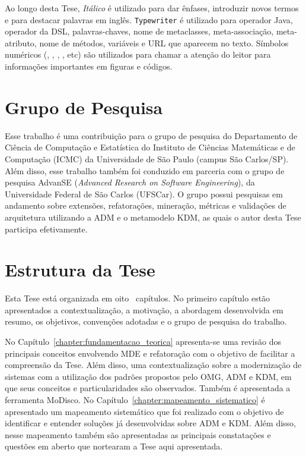 Ao longo desta Tese, \textit{Itálico} é utilizado para dar ênfases, introduzir novos termos e para destacar palavras em inglês. \texttt{Typewriter} é utilizado para operador Java, operador da DSL, palavras-chaves, nome de metaclasses, meta-associação, meta-atributo, nome de métodos, variáveis e URL que aparecem no texto. Símbolos numéricos (, , , , etc) são utilizados para chamar a atenção do leitor para informações importantes em figuras e códigos.

\section{Grupo de Pesquisa}

Esse trabalho é uma contribuição para o grupo de pesquisa do Departamento de Ciência de Computação e Estatística do Instituto de Ciências Matemáticas e de Computação (ICMC) da Universidade de São Paulo (campus São Carlos/SP). Além disso, esse trabalho também foi conduzido em parceria com o grupo de pesquisa AdvanSE (\textit{Advanced Research on Software Engineering}), da Universidade Federal de São Carlos (UFSCar). O grupo possui pesquisas em andamento sobre extensões, refatorações, mineração, métricas e validações de arquitetura utilizando a ADM e o metamodelo KDM, as quais o autor desta Tese participa efetivamente.

\section{Estrutura da Tese}

Esta Tese está organizada em oito~ capítulos. No primeiro capítulo estão apresentados a contextualização, a motivação, a abordagem desenvolvida em resumo, os objetivos, convenções adotadas e o grupo de pesquisa do trabalho. 

No Capítulo~\ref{chapter:fundamentacao_teorica} apresenta-se uma revisão dos principais conceitos envolvendo MDE e refatoração com o objetivo de facilitar a compreensão da Tese. Além disso, uma contextualização sobre a modernização de sistemas com a utilização dos padrões propostos pelo OMG, ADM e KDM, em que seus conceitos e particularidades são observados. Também é apresentada a ferramenta MoDisco. 
%
%
No Capítulo~\ref{chapter:mapeamento_sistematico} é apresentado um mapeamento sistemático que foi realizado com o objetivo de identificar e entender soluções já desenvolvidas sobre ADM e KDM. Além disso, nesse mapeamento também são apresentadas as principais constatações e questões em aberto que nortearam a Tese aqui apresentada.


